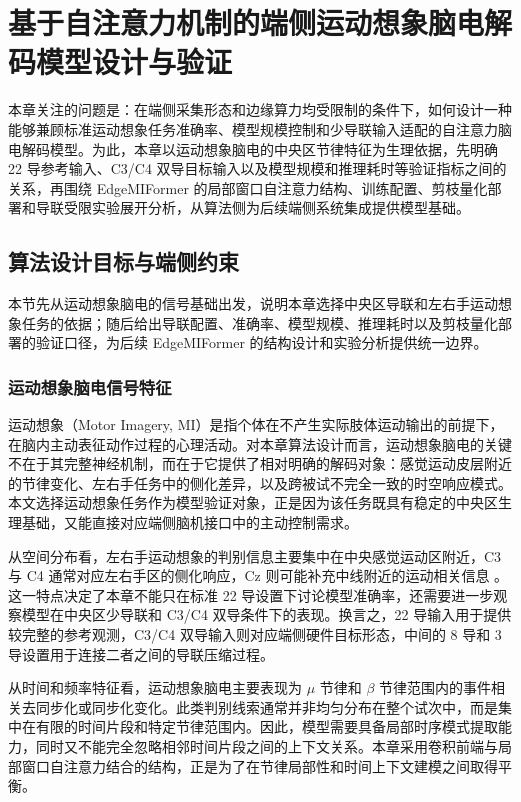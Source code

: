 \chapter{基于自注意力机制的端侧运动想象脑电解码模型设计与验证}
\label{cha:algorithm}

本章关注的问题是：在端侧采集形态和边缘算力均受限制的条件下，如何设计一种能够兼顾标准运动想象任务准确率、模型规模控制和少导联输入适配的自注意力脑电解码模型。为此，本章以运动想象脑电的中央区节律特征为生理依据，先明确 22 导参考输入、C3/C4 双导目标输入以及模型规模和推理耗时等验证指标之间的关系，再围绕 EdgeMIFormer 的局部窗口自注意力结构、训练配置、剪枝量化部署和导联受限实验展开分析，从算法侧为后续端侧系统集成提供模型基础。

\section{算法设计目标与端侧约束}
本节先从运动想象脑电的信号基础出发，说明本章选择中央区导联和左右手运动想象任务的依据；随后给出导联配置、准确率、模型规模、推理耗时以及剪枝量化部署的验证口径，为后续 EdgeMIFormer 的结构设计和实验分析提供统一边界。

\subsection{运动想象脑电信号特征}
运动想象（Motor Imagery, MI）是指个体在不产生实际肢体运动输出的前提下，在脑内主动表征动作过程的心理活动。对本章算法设计而言，运动想象脑电的关键不在于其完整神经机制，而在于它提供了相对明确的解码对象：感觉运动皮层附近的节律变化、左右手任务中的侧化差异，以及跨被试不完全一致的时空响应模式。本文选择运动想象任务作为模型验证对象，正是因为该任务既具有稳定的中央区生理基础，又能直接对应端侧脑机接口中的主动控制需求。

从空间分布看，左右手运动想象的判别信息主要集中在中央感觉运动区附近，C3 与 C4 通常对应左右手区的侧化响应，Cz 则可能补充中线附近的运动相关信息 \cite{Pfu06,Mcf04}。这一特点决定了本章不能只在标准 22 导设置下讨论模型准确率，还需要进一步观察模型在中央区少导联和 C3/C4 双导条件下的表现。换言之，22 导输入用于提供较完整的参考观测，C3/C4 双导输入则对应端侧硬件目标形态，中间的 8 导和 3 导设置用于连接二者之间的导联压缩过程。

从时间和频率特征看，运动想象脑电主要表现为 $\mu$ 节律和 $\beta$ 节律范围内的事件相关去同步化或同步化变化。此类判别线索通常并非均匀分布在整个试次中，而是集中在有限的时间片段和特定节律范围内。因此，模型需要具备局部时序模式提取能力，同时又不能完全忽略相邻时间片段之间的上下文关系。本章采用卷积前端与局部窗口自注意力结合的结构，正是为了在节律局部性和时间上下文建模之间取得平衡。

